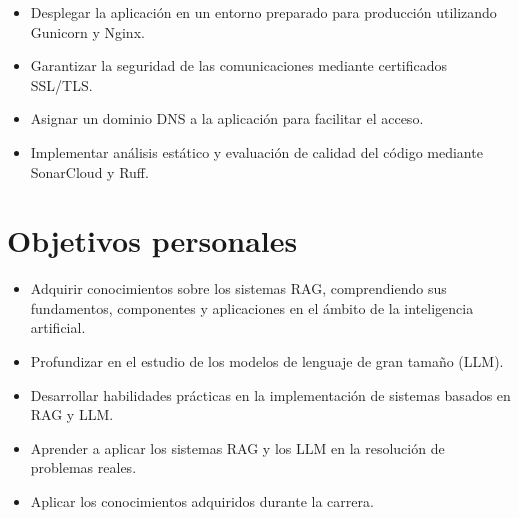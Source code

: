 \begin{itemize}
\begin{itemize}
		\item Desplegar la aplicación en un entorno preparado para producción utilizando Gunicorn y Nginx.
		\item Garantizar la seguridad de las comunicaciones mediante certificados SSL/TLS.
		\item Asignar un dominio DNS a la aplicación para facilitar el acceso.
		\item Implementar análisis estático y evaluación de calidad del código mediante SonarCloud y Ruff.
	\end{itemize}
\end{itemize}

\section{Objetivos personales}

\begin{itemize}
\tightlist
\item Adquirir conocimientos sobre los sistemas RAG, comprendiendo sus fundamentos, componentes y aplicaciones en el ámbito de la inteligencia artificial.
\item Profundizar en el estudio de los modelos de lenguaje de gran tamaño (LLM).
\item Desarrollar habilidades prácticas en la implementación de sistemas basados en RAG y LLM.
\item Aprender a aplicar los sistemas RAG y los LLM en la resolución de problemas reales.
\item Aplicar los conocimientos adquiridos durante la carrera.
\end{itemize}
